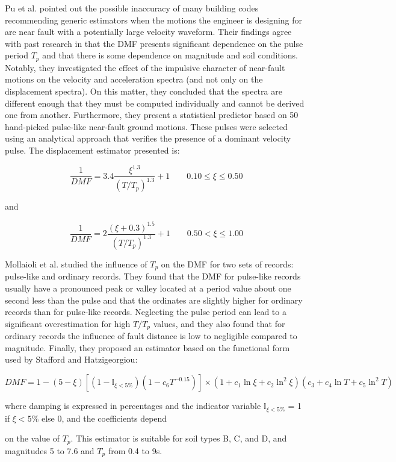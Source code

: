 Pu et al. pointed out the possible
inaccuracy of many building codes recommending generic estimators when
the motions the engineer is designing for are near fault with a
potentially large velocity waveform. Their findings agree with past
research in that the DMF presents significant dependence on the pulse
period \(T_p\) and that there is some dependence on magnitude and soil
conditions. Notably, they investigated the effect of the impulsive
character of near-fault motions on the velocity and acceleration spectra
(and not only on the displacement spectra). On this matter, they
concluded that the spectra are different enough that they must be
computed individually and cannot be derived one from another.
Furthermore, they present a statistical predictor based on 50
hand-picked pulse-like near-fault ground motions. These pulses were
selected using an analytical approach that verifies the presence of a
dominant velocity pulse. The displacement estimator presented is:

\[\frac{1}{DMF} = 3.4\frac{\xi^{1.3}}{(T/T_p)^{1.3}} + 1\qquad 0.10 \leq \xi \leq 0.50\]

and

\[\frac{1}{DMF} = 2\frac{(\xi + 0.3)^{1.5}}{(T/T_p)^{1.3}} + 1\qquad 0.50 < \xi \leq 1.00\]

Mollaioli et al. studied the
influence of \(T_p\) on the DMF for two sets of records: pulse-like and
ordinary records. They found that the DMF for pulse-like records usually
have a pronounced peak or valley located at a period value about one
second less than the pulse and that the ordinates are slightly higher
for ordinary records than for pulse-like records. Neglecting the pulse
period can lead to a significant overestimation for high \(T/T_p\)
values, and they also found that for ordinary records the influence of
fault distance is low to negligible compared to magnitude. Finally, they
proposed an estimator based on the functional form used by
Stafford and
Hatzigeorgiou:

\[DMF = 1 - (5 - \xi)[(1 - \mathbb{I}_{\xi<5\%})(1 - c_6 T^{-0.15})] \times (1 + c_1 \ln \xi + c_2 \ln^2 \xi)(c_3 + c_4 \ln T + c_5 \ln^2 T)\]

where damping is expressed in percentages and the indicator variable
\(\mathbb{I}_{\xi<5\%}\) = 1 if \(\xi < 5\%\) else 0, and the
coefficients depend

on the value of \(T_p\). This estimator is suitable for soil types B, C,
and D, and magnitudes 5 to 7.6 and \(T_p\) from 0.4 to 9s.

